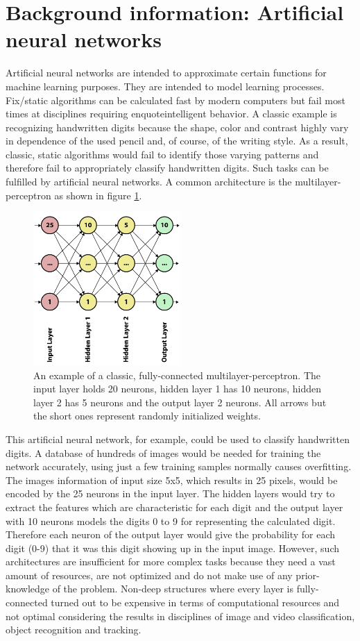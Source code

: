 \documentclass[12pt,twoside]{article}
\theoremstyle{plain}
\theoremstyle{definition}
\theoremstyle{remark}
\begin{document}
\section{Background information: Artificial neural networks}
\label{sec:ann}


Artificial neural networks are intended to approximate certain functions for machine learning purposes. They are intended to model learning processes. Fix/static algorithms can be calculated fast by modern computers but fail most times at disciplines requiring enquote{intelligent} behavior. A classic example is recognizing handwritten digits because the shape, color and contrast highly vary in dependence of the used pencil and, of course, of the writing style. As a result, classic, static algorithms would fail to identify those varying patterns and therefore fail to appropriately classify handwritten digits. Such tasks can be fulfilled by artificial neural networks. A common architecture is the multilayer-perceptron as shown in figure \ref{fig:mlp1}.
\begin{figure}
	\includegraphics[width=0.5\textwidth]{neuralnet1.pdf}
	{\caption{An example of a classic, fully-connected multilayer-perceptron. The input layer holds 20 neurons, hidden layer 1 has 10 neurons, hidden layer 2 has 5 neurons and the output layer 2 neurons. All arrows but the short ones represent randomly initialized weights.}\label{fig:mlp1}}
\end{figure}
This artificial neural network, for example, could be used to classify handwritten digits. A database of hundreds of images would be needed for training the network accurately, using just a few training samples normally causes overfitting. The images information of input size 5x5, which results in 25 pixels, would be encoded by the 25 neurons in the input layer. The hidden layers would try to extract the features which are characteristic for each digit and the output layer with 10 neurons models the digits 0 to 9 for representing the calculated digit. Therefore each neuron of the output layer would give the probability for each digit (0-9) that it was this digit showing up in the input image. However, such architectures are insufficient for more complex tasks because they need a vast amount of resources, are not optimized and do not make use of any prior-knowledge of the problem. Non-deep structures where every layer is fully-connected turned out to be expensive in terms of computational resources and not optimal considering the results in disciplines of image and video classification, object recognition and tracking.
\end{document}
